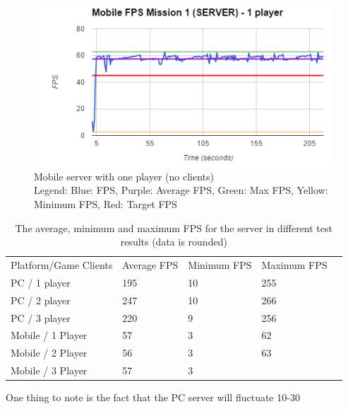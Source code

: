 \begin{figure}
    \includegraphics{figures/test/MobileServerOnePlayer}
    \caption{Mobile server with one player (no clients) \\ Legend: Blue: FPS, Purple: Average FPS, Green: Max FPS, Yellow: Minimum FPS, Red: Target FPS}
    \label{test:performance:mobileserverone}
\end{figure}

\begin{table}[h]
\begin{tabular}{lllll}\label{test:table:data}
Platform/Game Clients & Average FPS & Minimum FPS & Maximum FPS &  \\
PC / 1 player         & 195         & 10          & 255         &  \\
PC / 2 player         & 247         & 10          & 266         &  \\
PC / 3 player         & 220         & 9           & 256         &  \\
Mobile / 1 Player     & 57          & 3           & 62          &  \\
Mobile / 2 Player     & 56          & 3           & 63          &  \\
Mobile / 3 Player     & 57          & 3           &             & 
\end{tabular}
\caption{The average, minimum and maximum FPS for the server in different test results (data is rounded) }
\end{table}

One thing to note is the fact that the PC server will fluctuate 10-30%

